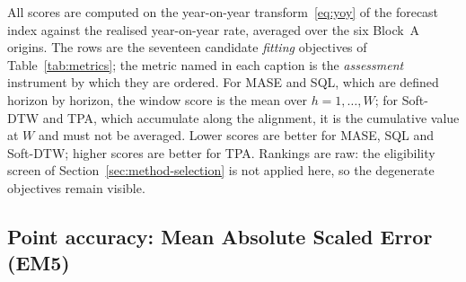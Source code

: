 \documentclass[12pt]{article}
\begin{document}
All scores are computed on the year-on-year transform~\eqref{eq:yoy} of the
forecast index against the realised year-on-year rate, averaged over the six
Block~A origins. The rows are the seventeen candidate \emph{fitting}
objectives of Table~\ref{tab:metrics}; the metric named in each caption is the
\emph{assessment} instrument by which they are ordered. For MASE and SQL, which
are defined horizon by horizon, the window score is the mean over
$h=1,\dots,W$; for Soft-DTW and TPA, which accumulate along the alignment, it
is the cumulative value at $W$ and must not be averaged. Lower scores are
better for MASE, SQL and Soft-DTW; higher scores are better for TPA. Rankings
are raw: the eligibility screen of Section~\ref{sec:method-selection} is not
applied here, so the degenerate objectives remain visible.

\subsection{Point accuracy: Mean Absolute Scaled Error (EM5)}
\label{app:blockA-point}
\end{document}
